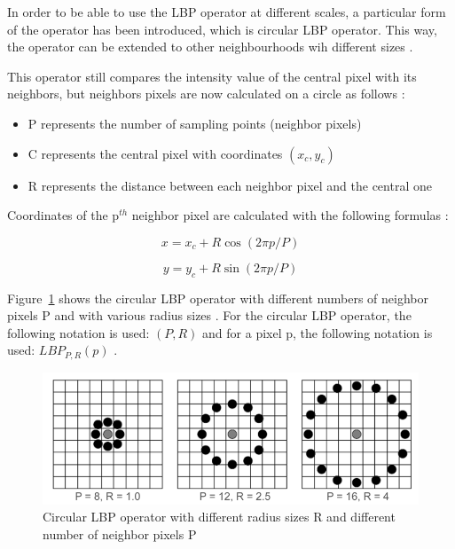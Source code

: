 \vspace{\baselineskip}
\noindent In order to be able to use the LBP operator at different scales, a particular form of the operator has been introduced, which is circular LBP operator. This way, the operator can be extended to other neighbourhoods wih different sizes \cite{GAN08}.
\newline

\noindent This operator still compares the intensity value of the central pixel with its neighbors, but neighbors pixels are now calculated on a circle as follows \cite{GAN08}:

\begin{itemize}
  \item P represents the number of sampling points (neighbor pixels)
  \item C represents the central pixel with coordinates $ (x_c,y_c) $
  \item R represents the distance between each neighbor pixel and the central one
\end{itemize}

\noindent Coordinates of the p$^{th}$ neighbor pixel are calculated with the following formulas \cite{JUL07}:
\newline

\begin{equation}
   x = x_c + R\cos(2\pi p/P)
\end{equation}

\begin{equation}
   y = y_c + R\sin(2\pi p/P)
\end{equation}

\vspace{\baselineskip}
\noindent Figure~\ref{lbp_circular_operator} shows the circular LBP operator with different numbers of neighbor pixels P and with various radius sizes \cite{JUL07}. For the circular LBP operator, the following notation is used: $ (P,R) $ and for a pixel p, the following notation is used: $ LBP_{P,R}(p) $ \cite{GAN08}.

\begin{figure}[!h]
\begin{center}
\noindent \includegraphics[scale=0.5]{figures/lbp_circular_operator} 
\newline
\caption{Circular LBP operator with different radius sizes R and different number of neighbor pixels P}
\label{lbp_circular_operator}
\end{center} 
\end{figure}

